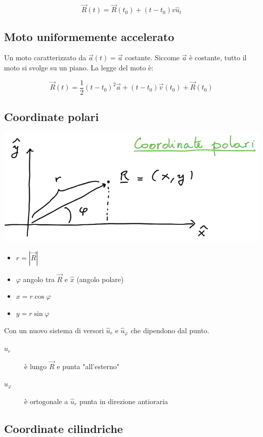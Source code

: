 \documentclass{subfiles}
\begin{document}
$$
\vec{R}(t) = \vec{R}(t_0) + (t-t_0)v\hat{u}_t
$$

\subsection{Moto uniformemente accelerato}

Un moto caratterizzato da $\vec{a}(t) = \vec{a}$ costante.
Siccome $\vec{a}$ è costante, tutto il moto si svolge su un piano.
La legge del moto è:

$$
\vec{R}(t) = \frac{1}{2}(t-t_0)^2 \vec{a} + (t-t_0) \vec{v}(t_0) + \vec{R}(t_0)
$$

\subsection{Coordinate polari}

\includegraphics[width=\columnwidth]{esempio-coordinate-polari}

\begin{itemize}
    \item $r = |\vec{R}|$
    \item $\varphi$ angolo tra $\vec{R}$ e $\hat{x}$ (angolo polare)
    \item $x = r \cos{\varphi}$
    \item $y = r \sin{\varphi}$
\end{itemize}

\noindent
Con un nuovo sistema di versori $\hat{u}_r$ e $\hat{u}_\varphi$ che dipendono dal punto.

\begin{description}
    \item[$\hat{u}_r$] è lungo $\vec{R}$ e punta "all'esterno"
    \item[$\hat{u}_\varphi$] è ortogonale a $\hat{u}_r$ punta in direzione antioraria
\end{description}

\subsection{Coordinate cilindriche}
\end{document}
